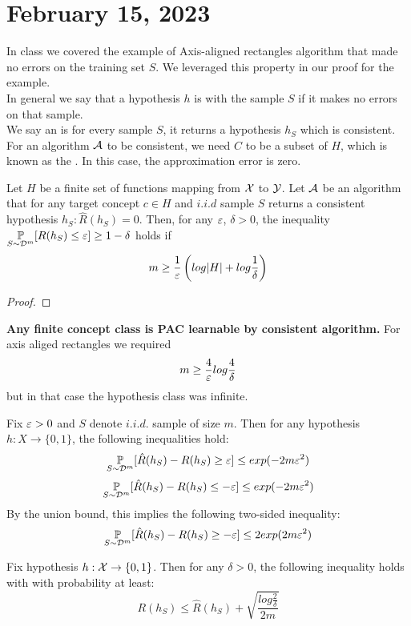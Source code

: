 \section{February 15, 2023}
In class we covered the example of Axis-aligned rectangles algorithm that made no errors on the training set $S$. We leveraged this property in our proof for the example. 
\\
In general we say that a hypothesis $h$ is  with the sample $S$ if it makes no errors on that sample. 
\\
We say an  is for every sample $S$, it returns a hypothesis $h_S$ which is consistent. For an algorithm $\mathcal A$ to be consistent, we need $C$ to be a subset of $H$, which is known as the . In this case, the approximation error is zero. 

\begin{theorem}
    Let $H$ be a finite set of functions mapping from $\mathcal X$ to $\mathcal Y$. Let $\mathcal A$ be an algorithm that for any target concept $c \in H$ and $i.i.d$ sample $S$ returns a consistent hypothesis $h_S: \hat{R}(h_S) = 0$. Then, for any $\varepsilon$, $\delta >0$, the inequality $\underset{S \sim \mathcal D^m}{\mathbb P}[R(h_S) \leq \varepsilon] \geq 1 - \delta$ holds if 
    $$
    m \geq \frac{1}{\varepsilon} \left(log|H| + log \frac{1}{\delta}
    \right)
    $$ 
\end{theorem}
\begin{proof}
\end{proof}
\textbf{Any finite concept class is PAC learnable by consistent algorithm.}
For axis aliged rectangles we required
$$
m \geq \frac{4}{\varepsilon} log \frac{4}{\delta}
$$
but in that case the hypothesis class was infinite.

\begin{corollary}
    Fix $\varepsilon >0$ and $S$ denote $i.i.d.$ sample of size $m$. 
    Then for any hypothesis $h:X \to \{0,1\}$, the following inequalities hold:
    $$
    \underset{S \sim \mathcal D^m}{\mathbb P}[\hat{R}(h_S)-R(h_S) \geq \varepsilon] \leq exp (-2m\varepsilon^2)
    $$
    $$
    \underset{S \sim \mathcal D^m}{\mathbb P}[\hat{R}(h_S)-R(h_S) \leq -\varepsilon] \leq exp(-2m\varepsilon^2)
    $$
    By the union bound, this implies the following two-sided inequality:
    $$
    \underset{S \sim \mathcal D^m}{\mathbb P}[\hat{R}(h_S)-R(h_S) \geq -\varepsilon] \leq 2exp(2m\varepsilon^2)
    $$
\end{corollary}
\begin{corollary}
    Fix hypothesis $h: \mathcal X \to \{0,1\}$.  Then for any $\delta >0$, the following inequality holds with with probability at least:
    $$
    R(h_S) \leq \hat{R}(h_S) + \sqrt{\frac{log \frac{2}{\delta}}{2m}}
    $$    
\end{corollary}


